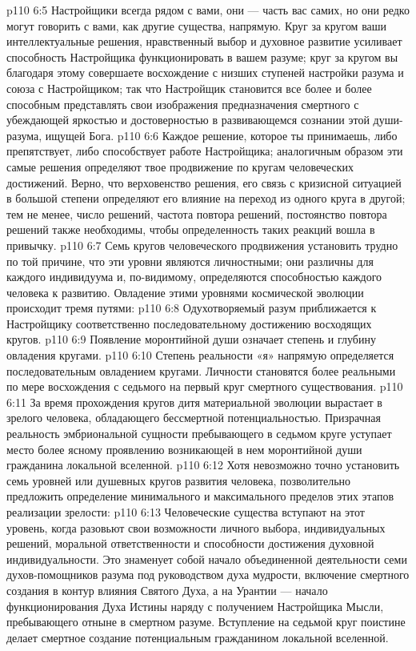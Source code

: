 \vs p110 6:5 \pc Настройщики всегда рядом с вами, они --- часть вас самих, но они редко могут говорить с вами, как другие существа, напрямую. Круг за кругом ваши интеллектуальные решения, нравственный выбор и духовное развитие усиливает способность Настройщика функционировать в вашем разуме; круг за кругом вы благодаря этому совершаете восхождение с низших ступеней настройки разума и союза с Настройщиком; так что Настройщик становится все более и более способным представлять свои изображения предназначения смертного с убеждающей яркостью и достоверностью в развивающемся сознании этой души\hyp{}разума, ищущей Бога.
\vs p110 6:6 \pc Каждое решение, которое ты принимаешь, либо препятствует, либо способствует работе Настройщика; аналогичным образом эти самые решения определяют твое продвижение по кругам человеческих достижений. Верно, что верховенство решения, его связь с кризисной ситуацией в большой степени определяют его влияние на переход из одного круга в другой; тем не менее, число решений, частота повтора решений, постоянство повтора решений также необходимы, чтобы определенность таких реакций вошла в привычку.
\vs p110 6:7 Семь кругов человеческого продвижения установить трудно по той причине, что эти уровни являются личностными; они различны для каждого индивидуума и, по\hyp{}видимому, определяются способностью каждого человека к развитию. Овладение этими уровнями космической эволюции происходит тремя путями:
\vs p110 6:8 \bibnobreakspace {} Одухотворяемый разум приближается к Настройщику соответственно последовательному достижению восходящих кругов.
\vs p110 6:9 \pc {}\bibnobreakspace {} Появление моронтийной души означает степень и глубину овладения кругами.
\vs p110 6:10 \pc {}\bibnobreakspace {} Степень реальности «я» напрямую определяется последовательным овладением кругами. Личности становятся более реальными по мере восхождения с седьмого на первый круг смертного существования.
\vs p110 6:11 \pc За время прохождения кругов дитя материальной эволюции вырастает в зрелого человека, обладающего бессмертной потенциальностью. Призрачная реальность эмбриональной сущности пребывающего в седьмом круге уступает место более ясному проявлению возникающей в нем моронтийной души гражданина локальной вселенной.
\vs p110 6:12 Хотя невозможно точно установить семь уровней или душевных кругов развития человека, позволительно предложить определение минимального и максимального пределов этих этапов реализации зрелости:
\vs p110 6:13 \pc {} Человеческие существа вступают на этот уровень, когда разовьют свои возможности личного выбора, индивидуальных решений, моральной ответственности и способности достижения духовной индивидуальности. Это знаменует собой начало объединенной деятельности семи духов\hyp{}помощников разума под руководством духа мудрости, включение смертного создания в контур влияния Святого Духа, а на Урантии --- начало функционирования Духа Истины наряду с получением Настройщика Мысли, пребывающего отныне в смертном разуме. Вступление на седьмой круг поистине делает смертное создание потенциальным гражданином локальной вселенной.
